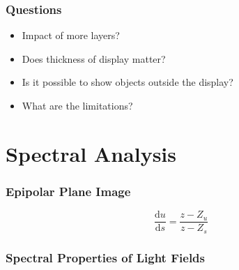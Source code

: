 \documentclass[12pt, compress]{beamer}
\begin{document}
\begin{frame}[fragile]
	\frametitle{Questions}
	
	\begin{itemize}[<+- | alert@+>]
		\item Impact of more layers?
		\item Does thickness of display matter?
		\item Is it possible to show objects outside the display?
		\item What are the limitations?
	\end{itemize}
\end{frame}

\section{Spectral Analysis}


\begin{frame}[fragile]
	\frametitle{Epipolar Plane Image}
	
	\begin{center}
		
		\hspace{1cm}
		
	\end{center}
	
	\begin{equation*}
		\frac{\text{d}u}{\text{d}s} = \frac{z - Z_u}{z - Z_s}
	\end{equation*}
	
\end{frame}

\begin{frame}[fragile]
	\frametitle{Spectral Properties of Light Fields}
	
	\begin{figure}
		
		\hspace{1cm}
	\end{figure}
\end{frame}
\end{document}
